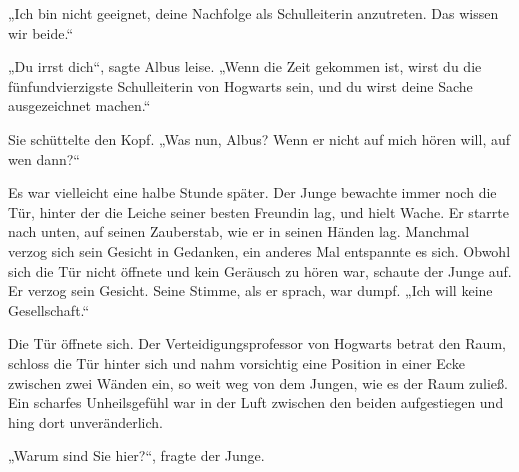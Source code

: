 „Ich bin nicht geeignet, deine Nachfolge als Schulleiterin anzutreten. Das wissen wir beide.“

„Du irrst dich“, sagte Albus leise.
„Wenn die Zeit gekommen ist, wirst du die fünfundvierzigste Schulleiterin von Hogwarts sein, und du wirst deine Sache ausgezeichnet machen.“

Sie schüttelte den Kopf.
„Was nun, Albus? Wenn er nicht auf mich hören will, auf wen dann?“

\later


Es war vielleicht eine halbe Stunde später. Der Junge bewachte immer noch die Tür, hinter der die Leiche seiner besten Freundin lag, und hielt Wache. Er starrte nach unten, auf seinen Zauberstab, wie er in seinen Händen lag. Manchmal verzog sich sein Gesicht in Gedanken, ein anderes Mal entspannte es sich. Obwohl sich die Tür nicht öffnete und kein Geräusch zu hören war, schaute der Junge auf. Er verzog sein Gesicht. Seine Stimme, als er sprach, war dumpf.
„Ich will keine Gesellschaft.“


Die Tür öffnete sich. Der Verteidigungsprofessor von Hogwarts betrat den Raum, schloss die Tür hinter sich und nahm vorsichtig eine Position in einer Ecke zwischen zwei Wänden ein, so weit weg von dem Jungen, wie es der Raum zuließ. Ein scharfes Unheilsgefühl war in der Luft zwischen den beiden aufgestiegen und hing dort unveränderlich.

„Warum sind Sie hier?“, fragte der Junge.

